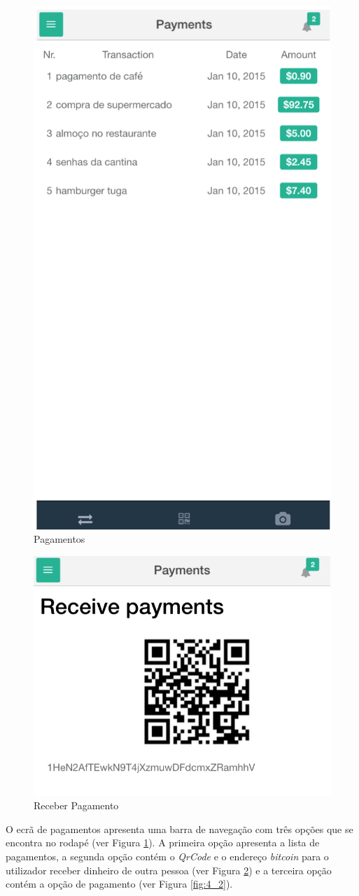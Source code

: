 \begin{figure}[H]
	\begin{center}
		\includegraphics[width=0.5
		\textwidth]{payments/payments.png}
	\end{center}
	\caption{Pagamentos}
	\label{fig:4}
\end{figure}

\begin{figure}[H]
	\begin{center}
		\includegraphics[width=0.5
		\textwidth]{payments/receive.png}
	\end{center}
	\caption{Receber Pagamento}
	\label{fig:4_1}
\end{figure}

O ecrã de pagamentos apresenta uma barra de navegação com três opções que se encontra no rodapé (ver Figura \ref{fig:4}). A primeira opção apresenta a lista de pagamentos, a segunda opção contém o \textit{QrCode} e o endereço \textit{bitcoin} para o utilizador receber dinheiro de outra pessoa (ver Figura \ref{fig:4_1}) e a terceira opção contém a opção de pagamento (ver Figura \ref{fig:4_2}).


